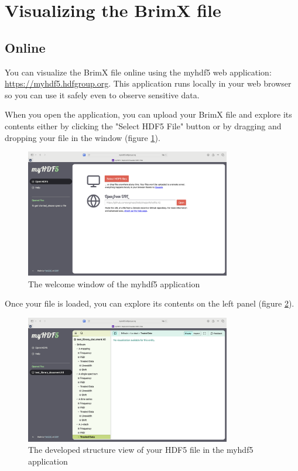 \documentclass{article}
\begin{document}
\section{Visualizing the BrimX file}

\subsection{Online}

You can visualize the BrimX file online using the myhdf5 web application: \url{https://myhdf5.hdfgroup.org}. This application runs locally in your web browser so you can use it safely even to observe sensitive data.

When you open the application, you can upload your BrimX file and explore its contents either by clicking the "Select HDF5 File" button or by dragging and dropping your file in the window (figure \ref{fig:my_hdf5_welcome}). 

\begin{figure}[H]
    \centering
    \includegraphics[width=0.8\textwidth]{img/MyHDF5_welcome_window.png}
    \caption{The welcome window of the myhdf5 application}
    \label{fig:my_hdf5_welcome}
\end{figure}

Once your file is loaded, you can explore its contents on the left panel (figure \ref{fig:my_hdf5_structure}).

\begin{figure}[H]
    \centering
    \includegraphics[width=0.8\textwidth]{img/MyHDF5_Developped structure.png}
    \caption{The developed structure view of your HDF5 file in the myhdf5 application}
    \label{fig:my_hdf5_structure}
\end{figure}
\end{document}
